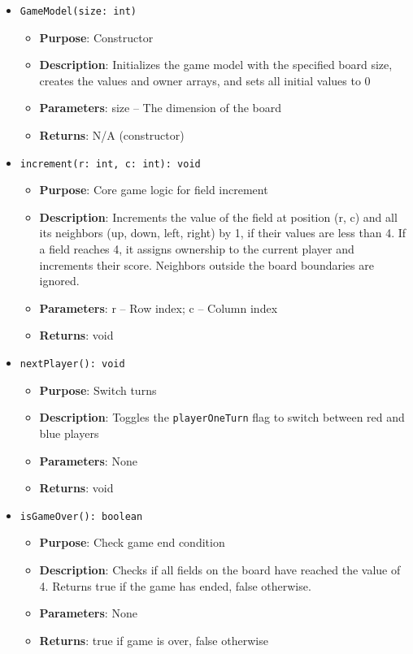\documentclass[12pt,a4paper]{article}
\begin{document}
\begin{itemize}
    \item \texttt{GameModel(size: int)}
    \begin{itemize}
        \item \textbf{Purpose}: Constructor
        \item \textbf{Description}: Initializes the game model with the specified board size, creates the values and owner arrays, and sets all initial values to 0
        \item \textbf{Parameters}: size -- The dimension of the board
        \item \textbf{Returns}: N/A (constructor)
    \end{itemize}
    
    \item \texttt{increment(r: int, c: int): void}
    \begin{itemize}
        \item \textbf{Purpose}: Core game logic for field increment
        \item \textbf{Description}: Increments the value of the field at position (r, c) and all its neighbors (up, down, left, right) by 1, if their values are less than 4. If a field reaches 4, it assigns ownership to the current player and increments their score. Neighbors outside the board boundaries are ignored.
        \item \textbf{Parameters}: r -- Row index; c -- Column index
        \item \textbf{Returns}: void
    \end{itemize}
    
    \item \texttt{nextPlayer(): void}
    \begin{itemize}
        \item \textbf{Purpose}: Switch turns
        \item \textbf{Description}: Toggles the \texttt{playerOneTurn} flag to switch between red and blue players
        \item \textbf{Parameters}: None
        \item \textbf{Returns}: void
    \end{itemize}
    
    \item \texttt{isGameOver(): boolean}
    \begin{itemize}
        \item \textbf{Purpose}: Check game end condition
        \item \textbf{Description}: Checks if all fields on the board have reached the value of 4. Returns true if the game has ended, false otherwise.
        \item \textbf{Parameters}: None
        \item \textbf{Returns}: true if game is over, false otherwise
    \end{itemize}
\end{itemize}
\end{document}
